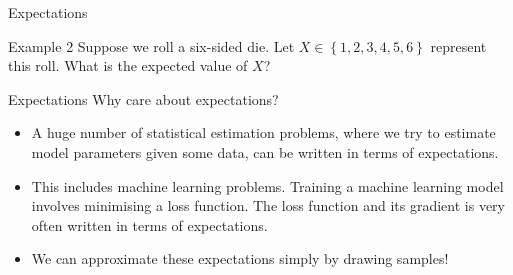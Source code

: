 \documentclass[10pt]{beamer}
\begin{document}
\begin{frame}[fragile]{Expectations}
\begin{exampleblock}{Example 2}
Suppose we roll a six-sided die. Let \(X \in \left\{1, 2, 3, 4, 5, 6\right\}\) represent this roll. What is the expected value of \(X\)?


\end{exampleblock}
\end{frame}

\begin{frame}[fragile]{Expectations}
Why care about expectations?
\begin{itemize}[<+->]
    \item A huge number of statistical estimation problems, where we try to estimate model parameters given some data, can be written in terms of expectations.
    \item This includes machine learning problems. Training a machine learning model involves minimising a loss function. The loss function and its gradient is very often written in terms of expectations.
    \item We can approximate these expectations simply by drawing samples!
\end{itemize}
\end{frame}
\end{document}
